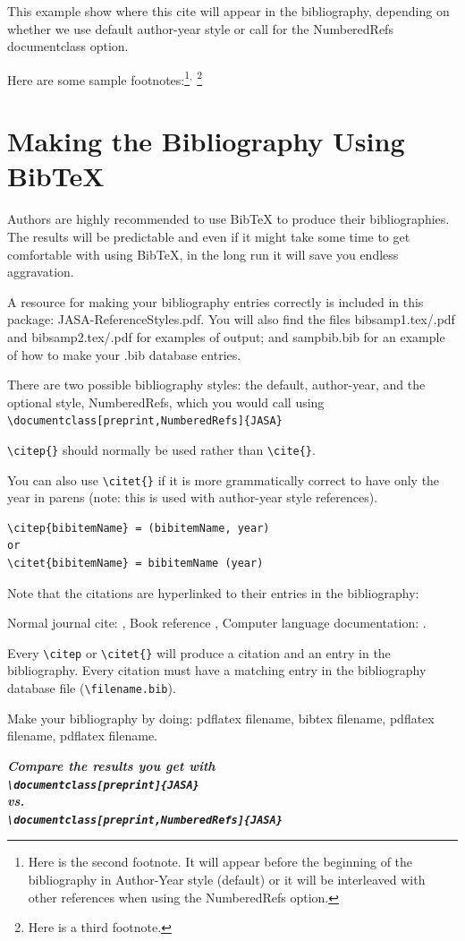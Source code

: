 \documentclass[preprint]{JASA}
\begin{document}
This example show where this cite \citep{booksamp1} will appear in the
bibliography,
depending on whether we use default author-year style
or call for the NumberedRefs documentclass option.

Here are some sample footnotes:\footnote{Here is the second footnote.
It will appear before the beginning of the bibliography in Author-Year
style (default) or it will be 
 interleaved with other references when using the Numbered\-Refs
 option.}$^,$%
\footnote{Here is a third footnote.}


\section{Making the Bibliography Using BibTeX}
Authors are highly  recommended to use BibTeX to produce their
bibliographies. The results will be predictable and even if
it might take some time to get comfortable with  using BibTeX,
in the long run it will save you endless aggravation.

A resource for making your bibliography entries
correctly is included in this package: 
JASA-ReferenceStyles.pdf. You will also find
the files
bibsamp1.tex/.pdf and bibsamp2.tex/.pdf
for examples of output; and sampbib.bib for an example of
how to make your .bib database entries.

There are two possible bibliography styles: the default, author-year,
and the optional style, Numbered\-Refs, which you would call using\\
{\verb+\documentclass[preprint,NumberedRefs]{JASA}+ }

\verb+\citep{}+ should normally be used rather than \verb+\cite{}+.



You can also use \verb+\citet{}+ if it is more grammatically correct
to have only the year in parens (note: this is used with author-year style references).

\begin{verbatim}
\citep{bibitemName} = (bibitemName, year)
or
\citet{bibitemName} = bibitemName (year)
\end{verbatim}

Note that the citations are hyperlinked to their entries in the
bibliography:

Normal journal cite: \citep{joursamp1},
 Book reference \citet{booksamp1}, 
Computer language documentation:
\citep{sampcode2}.

Every \verb+\citep+  or \verb+\citet{}+ will produce a citation and an entry in the
bibliography. Every citation must have a matching entry in the
bibliography
database file (\verb+\filename.bib+).

Make your bibliography by doing: pdflatex filename,  bibtex filename,
pdflatex filename, pdflatex filename.

{\bfseries\itshape
Compare the results you get with\\
{\verb+\documentclass[preprint]{JASA}+ }\\
vs.\\
{\verb+\documentclass[preprint,NumberedRefs]{JASA}+ }
}


\end{document}
